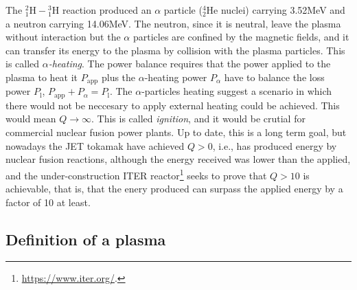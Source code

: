 \documentclass[a4paper,12pt,oneside]{book}
\begin{document}
The ${}_1^2 \text{H}-{}_1^3 \text{H}$ reaction produced an $\alpha$ particle ($^4_2 \text{He}$ nuclei) carrying 3.52MeV and a neutron carrying 14.06MeV. The neutron, since it is neutral, leave the plasma without interaction but the $\alpha$ particles are confined by the magnetic fields, and it can transfer its energy to the plasma by collision with the plasma particles. This is called \textit{$\alpha$-heating}. The power balance requires that the power applied to the plasma to heat it $P_\text{app}$ plus the $\alpha$-heating power $P_\alpha$ have to balance the loss power $P_\text{l}$, $P_\text{app}+P_\alpha=P_\text{l}$. The $\alpha$-particles heating suggest a scenario in which there would not be neccesary to apply external heating could be achieved. This would mean $Q \rightarrow \infty$. This is called \textit{ignition}, and it would be crutial for commercial nuclear fusion power plants. Up to date, this is a long term goal, but nowadays the JET tokamak have achieved $Q>0$, i.e., has produced energy by nuclear fusion reactions, although the energy received was lower than the applied, and the under-construction ITER reactor\footnote{\url{https://www.iter.org/}.} seeks to prove that $Q>10$ is achievable, that is, that the enery produced can surpass the applied energy by a factor of 10 at least.




\subsection{Definition of a plasma}
\end{document}
